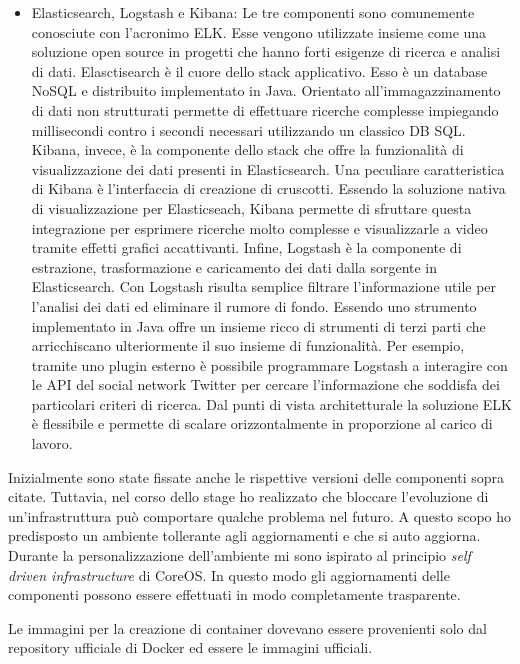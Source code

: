 \begin{itemize}
	\item Elasticsearch, Logstash e Kibana: Le tre componenti sono comunemente conosciute con l'acronimo ELK.  Esse vengono utilizzate insieme come una soluzione open source in progetti che hanno forti esigenze di ricerca e analisi di dati. Elasctisearch è il cuore dello stack applicativo. Esso è un database NoSQL e distribuito implementato in Java. Orientato all'immagazzinamento di dati non strutturati permette di effettuare ricerche complesse impiegando millisecondi contro i secondi necessari utilizzando un classico DB SQL. Kibana, invece, è la componente dello stack che offre la funzionalità di visualizzazione dei dati presenti in Elasticsearch. Una peculiare caratteristica di Kibana è l'interfaccia di creazione di cruscotti. Essendo la soluzione nativa di visualizzazione per Elasticseach, Kibana permette di sfruttare questa integrazione per esprimere ricerche molto complesse e visualizzarle a video tramite effetti grafici accattivanti. Infine, Logstash è la componente di estrazione, trasformazione e caricamento dei dati dalla sorgente in Elasticsearch. Con Logstash risulta semplice filtrare l'informazione utile per l'analisi dei dati ed eliminare il rumore di fondo. Essendo uno strumento implementato in Java offre un insieme ricco di strumenti di terzi parti che arricchiscano ulteriormente il suo insieme di funzionalità. Per esempio, tramite uno plugin esterno è possibile programmare Logstash a interagire con le API del social network Twitter per cercare l'informazione che soddisfa dei particolari criteri di ricerca. 
	Dal punti di vista architetturale la soluzione ELK è flessibile e permette di scalare orizzontalmente in proporzione al carico di lavoro. 	
\end{itemize}

Inizialmente sono state fissate anche le rispettive versioni delle componenti 
sopra citate. Tuttavia, nel corso dello stage ho realizzato che bloccare l'evoluzione di un'infrastruttura può comportare qualche problema nel futuro. A questo scopo ho predisposto un ambiente tollerante agli aggiornamenti e che si auto aggiorna. Durante la personalizzazione dell'ambiente mi sono ispirato al principio  \textit{self driven infrastructure} di CoreOS. 
In questo modo gli aggiornamenti delle componenti possono essere effettuati in modo completamente trasparente.

Le immagini per la creazione di container dovevano essere provenienti solo 
dal repository ufficiale di Docker ed essere le immagini ufficiali.